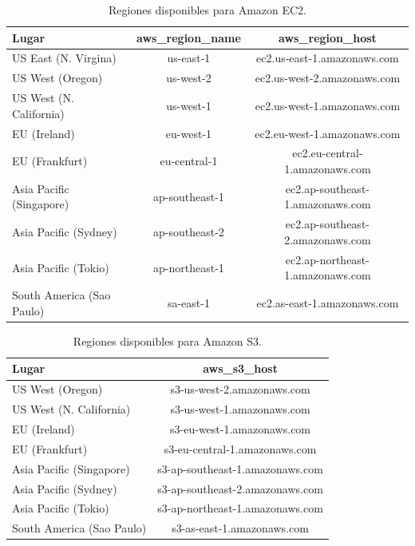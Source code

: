 \documentclass{article}
\begin{document}
\begin{table}[h]
	\begin{center}
		\caption{Regiones disponibles para Amazon EC2.}
		\begin{tabular}{|l|c|c|}
\hline
\textbf{Lugar} &
\textbf{aws\_region\_name} &
\textbf{aws\_region\_host} \\ \hline
\hline
US East (N. Virgina)          & us-east-1          &  ec2.us-east-1.amazonaws.com \\ \hline
US West (Oregon)             & us-west-2         &  ec2.us-west-2.amazonaws.com \\ \hline
US West (N. California)      & us-west-1         &  ec2.us-west-1.amazonaws.com \\ \hline
EU (Ireland)                       & eu-west-1         &  ec2.eu-west-1.amazonaws.com \\ \hline
EU (Frankfurt)                   & eu-central-1      & ec2.eu-central-1.amazonaws.com \\ \hline
Asia Pacific (Singapore)     & ap-southeast-1 & ec2.ap-southeast-1.amazonaws.com \\ \hline
Asia Pacific (Sydney)         & ap-southeast-2 & ec2.ap-southeast-2.amazonaws.com \\ \hline
Asia Pacific (Tokio)            & ap-northeast-1 & ec2.ap-northeast-1.amazonaws.com \\ \hline
South America (Sao Paulo) & sa-east-1         & ec2.as-east-1.amazonaws.com \\ \hline
		\end{tabular}
		\label{tab:ec2-endpoint}
	\end{center}
\end{table}

\begin{table}[h]
	\begin{center}
		\caption{Regiones disponibles para Amazon S3.}
		\begin{tabular}{|l|c|}
\hline
\textbf{Lugar} &
\textbf{aws\_s3\_host} \\ \hline
\hline
US West (Oregon)            &  s3-us-west-2.amazonaws.com \\ \hline
US West (N. California)     &  s3-us-west-1.amazonaws.com \\ \hline
EU (Ireland)                       &  s3-eu-west-1.amazonaws.com \\ \hline
EU (Frankfurt)                   & s3-eu-central-1.amazonaws.com \\ \hline
Asia Pacific (Singapore)     & s3-ap-southeast-1.amazonaws.com \\ \hline
Asia Pacific (Sydney)         & s3-ap-southeast-2.amazonaws.com \\ \hline
Asia Pacific (Tokio)            & s3-ap-northeast-1.amazonaws.com \\ \hline
South America (Sao Paulo) & s3-as-east-1.amazonaws.com \\ \hline
		\end{tabular}
		\label{tab:s3-endpoint}
	\end{center}
\end{table}
\end{document}
